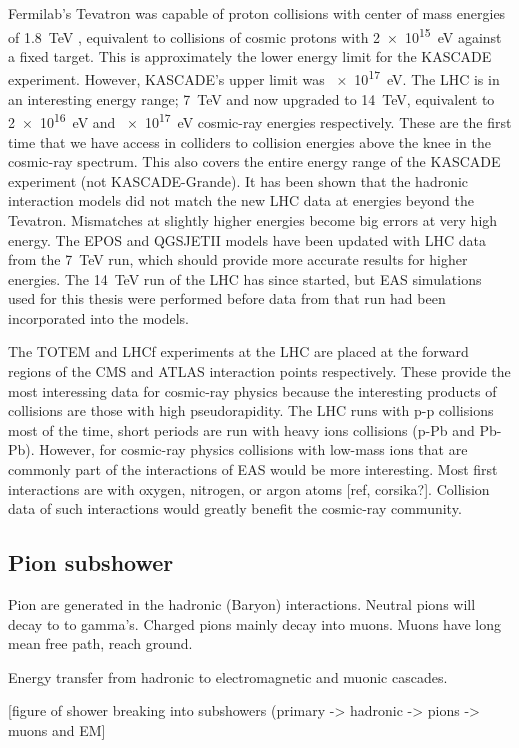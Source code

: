 Fermilab's Tevatron was capable of proton collisions with center of mass energies of \SI{1.8}{\TeV} \cite{abe1994tevatron}, equivalent to collisions of cosmic protons with \SI{2e15}{\eV} against a fixed target. This is approximately the lower energy limit for the KASCADE experiment. However, KASCADE's upper limit was \SI{e17}{\eV}. The LHC is in an interesting energy range; \SI{7}{\TeV} and now upgraded to \SI{14}{\TeV}, equivalent to \SI{2e16}{\eV} and \SI{e17}{\eV} cosmic-ray energies respectively. These are the first time that we have access in colliders to collision energies above the knee in the cosmic-ray spectrum. This also covers the entire energy range of the KASCADE experiment (not KASCADE-Grande). It has been shown that the hadronic interaction models did not match the new LHC data at energies beyond the Tevatron. Mismatches at slightly higher energies become big errors at very high energy. The EPOS and QGSJETII models have been updated with LHC data from the \SI{7}{\TeV} run, which should provide more accurate results for higher energies. The \SI{14}{\TeV} run of the LHC has since started, but EAS simulations used for this thesis were performed before data from that run had been incorporated into the models.

The TOTEM and LHCf experiments at the LHC are placed at the forward regions of the CMS and ATLAS interaction points respectively. These provide the most interessing data for cosmic-ray physics because the interesting products of collisions are those with high pseudorapidity. The LHC runs with p-p collisions most of the time, short periods are run with heavy ions collisions (p-Pb and Pb-Pb). However, for cosmic-ray physics collisions with low-mass ions that are commonly part of the interactions of EAS would be more interesting. Most first interactions are with oxygen, nitrogen, or argon atoms [ref, corsika?]. Collision data of such interactions would greatly benefit the cosmic-ray community.


\subsection{Pion subshower}

Pion are generated in the hadronic (Baryon) interactions. Neutral pions will decay to to gamma's. Charged pions mainly decay into muons. Muons have long mean free path, reach ground.

Energy transfer from hadronic to electromagnetic and muonic cascades.

[figure of shower breaking into subshowers (primary -> hadronic -> pions -> muons and EM]


